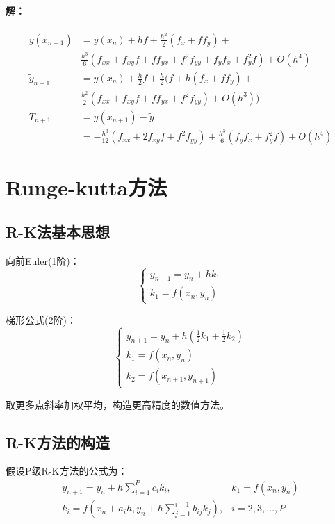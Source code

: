 \documentclass{article}
\begin{document}
\paragraph{解：}
    \begin{equation*}
        \begin{split}
            y(x_{n+1})&=y(x_n)+hf+\frac{h^2}{2}(f_x+ff_y)+ \\
            & \frac{h^3}{6}(f_{xx} + f_{xy}f + ff_{yx}+f^2f_{yy}+f_yf_x+f^2_yf) + O(h^4) \\
            \widetilde{y}_{n+1} &= y(x_n) + \frac{h}{2}f + \frac{h}{2}(f+ h(f_x+ff_y)+ \\
            &\frac{h^2}{2}(f_{xx} + f_{xy}f + ff_{yx}+f^2f_{yy}) + O(h^3))\\
            T_{n+1} &= y(x_{n+1}) - \widetilde{y} \\
            &= -\frac{h^3}{12}(f_{xx} + 2f_{xy}f +f^2f_{yy}) + \frac{h^3}{6}(f_yf_x+f^2_yf) + O(h^4)
        \end{split}
    \end{equation*}


\section{Runge-kutta方法}
\subsection{R-K法基本思想}
向前Euler(1阶)：
$$
\left\{
\begin{array}{lr}
    y_{n+1} = y_n+hk_1\\
    k_1=f(x_n, y_n)
\end{array}\right.
$$

梯形公式(2阶)：
$$
\left\{
\begin{array}{lr}
    y_{n+1} = y_n + h(\frac{1}{2}k_1+\frac{1}{2}k_2)\\
    k_1 = f(x_n, y_n)\\
    k_2 = f(x_{n+1}, y_{n+1})
\end{array}\right.
$$

取更多点斜率加权平均，构造更高精度的数值方法。

\subsection{R-K方法的构造}
假设P级R-K方法的公式为：
\begin{equation}
\begin{array}{lr}
    y_{n+1} = y_n +h\sum^P_{i=1}c_ik_i, &k_1=f(x_n,y_n)\\
    k_i = f(x_n+a_ih, y_n+h\sum^{i-1}_{j=1}b_{ij}k_j), & i=2,3,\dots, P 
\end{array}
\end{equation}
\end{document}
